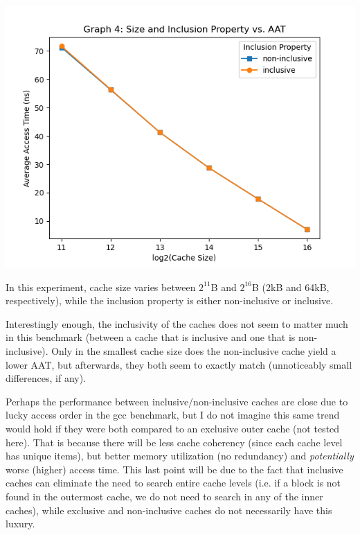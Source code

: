 \documentclass{article}
\begin{document}
    \includegraphics[width=\textwidth]{../graph_logs/graph4.png}

    In this experiment, cache size varies between $2^{11}$B and $2^{16}$B (2kB and 64kB, respectively), while 
    the inclusion property is either non-inclusive or inclusive.

    Interestingly enough, the inclusivity of the caches does not seem to matter much in this benchmark (between a cache 
    that is inclusive and one that is non-inclusive). Only in the smallest cache size does the non-inclusive cache 
    yield a lower AAT, but afterwards, they both seem to exactly match (unnoticeably small differences, if any).

    Perhaps the performance between inclusive/non-inclusive caches are close due to lucky access order in the gcc 
    benchmark, but I do not imagine this same trend would hold if they were both compared to an exclusive outer cache (not 
    tested here). That is because there will be less cache coherency (since each cache level has unique items), but 
    better memory utilization (no redundancy) and \textit{potentially} worse (higher) access time. This last point will 
    be due to the fact that inclusive caches can eliminate the need to search entire cache levels (i.e. if a block is not 
    found in the outermost cache, we do not need to search in any of the inner caches), while exclusive and non-inclusive 
    caches do not necessarily have this luxury.
\end{document}
